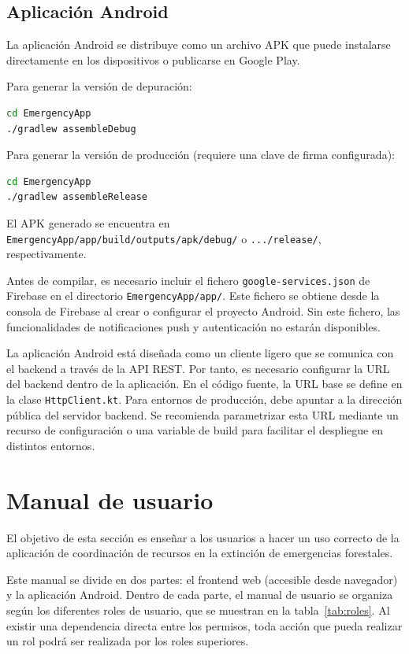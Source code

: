 \subsection{Aplicación Android}

La aplicación Android se distribuye como un archivo APK que puede instalarse directamente en los dispositivos o publicarse en Google Play.

Para generar la versión de depuración:

\begin{lstlisting}[language=Bash]
cd EmergencyApp
./gradlew assembleDebug
\end{lstlisting}

Para generar la versión de producción (requiere una clave de firma configurada):

\begin{lstlisting}[language=Bash]
cd EmergencyApp
./gradlew assembleRelease
\end{lstlisting}

El APK generado se encuentra en \texttt{EmergencyApp/app/build/outputs/apk/debug/} o \texttt{.../release/}, respectivamente.

Antes de compilar, es necesario incluir el fichero \texttt{google-services.json} de Firebase en el directorio \texttt{EmergencyApp/app/}. Este fichero se obtiene desde la consola de Firebase al crear o configurar el proyecto Android. Sin este fichero, las funcionalidades de notificaciones push y autenticación no estarán disponibles.

La aplicación Android está diseñada como un cliente ligero que se comunica con el backend a través de la API REST. Por tanto, es necesario configurar la URL del backend dentro de la aplicación. En el código fuente, la URL base se define en la clase \texttt{HttpClient.kt}. Para entornos de producción, debe apuntar a la dirección pública del servidor backend. Se recomienda parametrizar esta URL mediante un recurso de configuración o una variable de build para facilitar el despliegue en distintos entornos.

\section{Manual de usuario}
\label{sec:manualusuario}

El objetivo de esta sección es enseñar a los usuarios a hacer un uso correcto de la aplicación de coordinación de recursos en la extinción de emergencias forestales.

Este manual se divide en dos partes: el frontend web (accesible desde navegador) y la aplicación Android. Dentro de cada parte, el manual de usuario se organiza según los diferentes roles de usuario, que se muestran en la tabla~\ref{tab:roles}. Al existir una dependencia directa entre los permisos, toda acción que pueda realizar un rol podrá ser realizada por los roles superiores.

